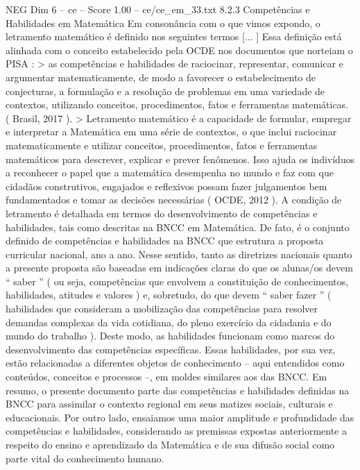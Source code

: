 \begin{textsample}{NEG Dim 6 – ce – Score 1.00 – ce/ce\_em\_33.txt}  \label{ex:f6_neg_253}
8.2.3 Competências e Habilidades em Matemática Em consonância com o que vimos expondo, o letramento matemático é definido nos seguintes termos [... ] Essa definição está alinhada com o conceito estabelecido pela OCDE nos documentos que norteiam o PISA : > as competências e habilidades de raciocinar, representar, comunicar e argumentar matematicamente, de modo a favorecer o estabelecimento de conjecturas, a formulação e a resolução de problemas em uma variedade de contextos, utilizando conceitos, procedimentos, fatos e ferramentas matemáticas. ( Brasil, 2017 ). > Letramento matemático é a capacidade de formular, empregar e interpretar a Matemática em uma série de contextos, o que inclui raciocinar matematicamente e utilizar conceitos, procedimentos, fatos e ferramentas matemáticos para descrever, explicar e prever fenômenos.
Isso ajuda os indivíduos a reconhecer o papel que a matemática desempenha no mundo e faz com que cidadãos construtivos, engajados e reflexivos possam fazer julgamentos bem fundamentados e tomar as decisões necessárias ( OCDE, 2012 ).
A condição de letramento é detalhada em termos do desenvolvimento de competências e habilidades, tais como descritas na BNCC em Matemática.
De fato, é o conjunto definido de competências e habilidades na BNCC que estrutura a proposta curricular nacional, ano a ano.
Nesse sentido, tanto as diretrizes nacionais quanto a presente proposta são baseadas em indicações claras do que os alunas/os devem “ saber ” ( ou seja, competências que envolvem a constituição de conhecimentos, habilidades, atitudes e valores ) e, sobretudo, do que devem “ saber fazer ” ( habilidades que consideram a mobilização das competências para resolver demandas complexas da vida cotidiana, do pleno exercício da cidadania e do mundo do trabalho ).
Deste modo, as habilidades funcionam como marcos do desenvolvimento das competências específicas.
Essas habilidades, por sua vez, estão relacionadas a diferentes objetos de conhecimento – aqui entendidos como conteúdos, conceitos e processos –, em moldes similares aos das BNCC.
Em resumo, o presente documento parte das competências e habilidades definidas na BNCC para assimilar o contexto regional em seus matizes sociais, culturais e educacionais.
Por outro lado, ensaiamos uma maior amplitude e profundidade das competências e habilidades, considerando as premissas expostas anteriormente a respeito do ensino e aprendizado da Matemática e de sua difusão social como parte vital do conhecimento humano.

\end{textsample}

